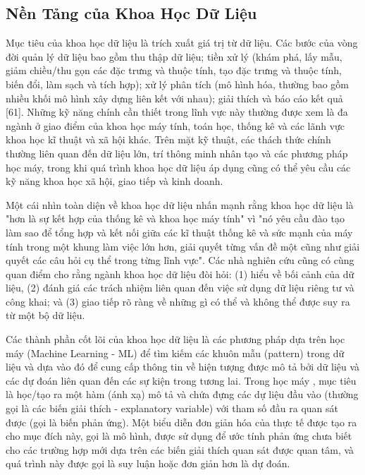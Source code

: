 \documentclass[utf8]{frontiersSCNS} %
\begin{document}
\subsection{Nền Tảng của Khoa Học Dữ Liệu}
Mục tiêu của khoa học dữ liệu là trích xuất giá trị từ dữ liệu. Các bước của vòng đời quản lý dữ liệu bao gồm thu thập dữ liệu; tiền xử lý (khám phá, lấy mẫu, giảm chiều/thu gọn các đặc trưng và thuộc tính, tạo đặc trưng và thuộc tính, biến đổi, làm sạch và tích hợp); xử lý phân tích (mô hình hóa, thường bao gồm nhiều khối mô hình xây dựng liên kết với nhau); giải thích và báo cáo kết quả [61]. Những kỹ năng chính cần thiết trong lĩnh vực này thường được xem là đa ngành ở giao điểm của khoa học máy tính, toán học, thống kê và các lãnh vực khoa học kĩ thuật và xã hội khác. Trên mặt kỹ thuật, các thách thức chính thường liên quan đến dữ liệu lớn, trí thông minh nhân tạo và các phương pháp học máy, trong khi quá trình khoa học dữ liệu áp dụng cũng có thể yêu cầu các kỹ năng khoa học xã hội, giao tiếp và kinh doanh. 

Một cái nhìn toàn diện về khoa học dữ liệu nhấn mạnh rằng khoa học dữ liệu là "hơn là sự kết hợp của thống kê và khoa học máy tính" vì "nó yêu cầu đào tạo làm sao để tổng hợp và kết nối giữa các kĩ thuật thống kê và sức mạnh của máy tính trong một khung làm việc lớn hơn, giải quyết từng vấn đề một cũng như giải quyết các câu hỏi cụ thể trong từng lĩnh vực". Các nhà nghiên cứu cũng có cùng quan điểm cho rằng ngành khoa học dữ liệu đòi hỏi: (1) hiểu về bối cảnh của dữ liệu, (2) đánh giá các trách nhiệm liên quan đến việc sử dụng dữ liệu riêng tư và công khai; và (3) giao tiếp rõ ràng về những gì có thể và không thể được suy ra từ một bộ dữ liệu.

Các thành phần cốt lõi của khoa học dữ liệu là các phương pháp dựa trên học máy (Machine Learning - ML) để tìm kiếm các khuôn mẫu (pattern) trong dữ liệu và dựa vào đó để cung cấp thông tin về hiện tượng được mô tả bởi dữ liệu và các dự đoán liên quan đến các sự kiện trong tương lai. Trong học máy , mục tiêu là học/tạo ra một hàm (ánh xạ) mô tả và chứa đựng các dự liệu đầu vào (thường gọi là các biến giải thích - explanatory variable) với tham số đầu ra quan sát được (gọi là biến phản ứng). Một biểu diễn đơn giản hóa của thực tế được tạo ra cho mục đích này, gọi là mô hình, được sử dụng để ước tính phản ứng chưa biết cho các trường hợp mới dựa trên các biến giải thích quan sát được quan tâm, và quá trình này được gọi là suy luận hoặc đơn giản hơn là dự đoán.
\end{document}
